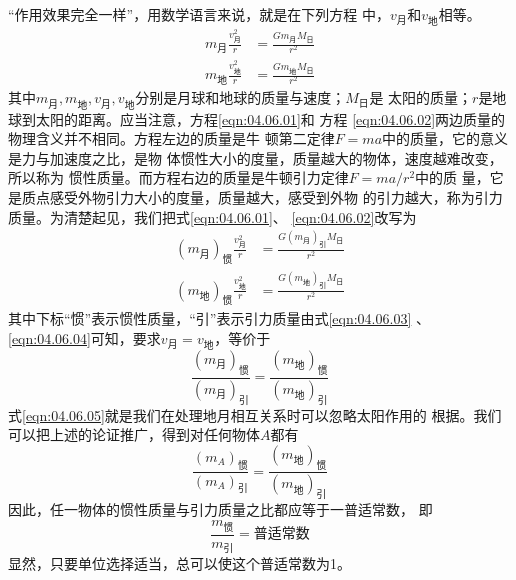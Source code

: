 “作用效果完全一样”，用数学语言来说，就是在下列方程
中，$ v_\text{月} $和$v_\text{地}$相等。
\begin{align}
  m _ { \text{月} } \frac { v _ { \text{月} } ^ { 2 } } { r } & = \frac { G m _ { \text{月} } M _ { \text{日} } } { r ^ { 2 } } \label{eqn:04.06.01} \\
  m _ { \text{地} } \frac { v _ { \text{地} } ^ { 2 } } { r } & = \frac { G m _ { \text{地} } M _ { \text{日} } } { r ^ { 2 } } \label{eqn:04.06.02}
\end{align}
其中$ m _ { \text{月} } , m _ { \text{地} } , v _ { \text{月} } , v _ { \text{地} } $分别是月球和地球的质量与速度；$ M _ { \text{日} } $是
太阳的质量；$ r $是地球到太阳的距离。应当注意，方程\eqref{eqn:04.06.01}和
方程 \eqref{eqn:04.06.02}两边质量的物理含义并不相同。方程左边的质量是牛
顿第二定律$ F = m a $中的质量，它的意义是力与加速度之比，是物
体惯性大小的度量，质量越大的物体，速度越难改变，所以称为
惯性质量。而方程右边的质量是牛顿引力定律$ F = m a / r ^ { 2 } $中的质
量，它是质点感受外物引力大小的度量，质量越大，感受到外物
的引力越大，称为引力质量。为清楚起见，我们把式\eqref{eqn:04.06.01}、
\eqref{eqn:04.06.02}改写为
\begin{align}
  \left(m _ { \text{月} }\right) _ {\text{惯}}
  \frac { v _ { \text{月} } ^ 2 } { r } & = \frac { G \left(m _ { \text{月} }\right) _ {\text{引}} M _ { \text{日} } } { r ^ { 2 } }\label{eqn:04.06.03} \\
  \left(m _ { \text{地} }\right) _ {\text{惯}}
  \frac { v _ { \text{地} } ^ 2 } { r } & = \frac { G \left(m _ { \text{地} }\right) _ {\text{引}} M _ { \text{日} } } { r ^ { 2 } }\label{eqn:04.06.04}
\end{align}
其中下标“惯”表示惯性质量，“引”表示引力质量由式\eqref{eqn:04.06.03}
、\eqref{eqn:04.06.04}可知，要求$ v _ { \text{月}}=v _ { \text{地} } $，等价于
\begin{equation}\label{eqn:04.06.05}
  \frac { \left(m _ { \text{月} }\right) _ {\text{惯}} } { \left(m _ { \text{月} }\right) _ {\text{引}} } = \frac { \left(m _ { \text{地} }\right) _ {\text{惯}} } { \left(m _ { \text{地} }\right) _ {\text{引}} }
\end{equation}
式\eqref{eqn:04.06.05}就是我们在处理地月相互关系时可以忽略太阳作用的
根据。我们可以把上述的论证推广，得到对任何物体$ A $都有
\begin{equation}\label{eqn:04.06.06}
  \frac { \left(m _ { A }\right) _ {\text{惯}} } { \left(m _ { A }\right) _ {\text{引}} } = \frac { \left(m _ { \text{地} }\right) _ {\text{惯}} } { \left(m _ { \text{地} }\right) _ {\text{引}} }
\end{equation}
因此，任一物体的惯性质量与引力质量之比都应等于一普适常数，
即
\begin{equation}\label{eqn:04.06.07}
  \frac { m _ {\text{惯}} } { m _ {\text{引}} } = \text{普适常数}
\end{equation}
显然，只要单位选择适当，总可以使这个普适常数为1。

